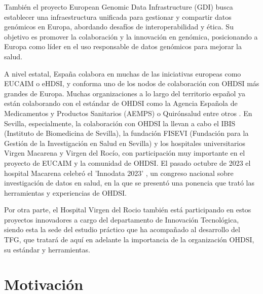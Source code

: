 También el proyecto European Genomic Data Infrastructure (GDI) \cite{GDI2022GDI} busca establecer una infraestructura unificada para gestionar y compartir datos genómicos en Europa, abordando desafíos de interoperabilidad y ética. Su objetivo es promover la colaboración y la innovación en genómica, posicionando a Europa como líder en el uso responsable de datos genómicos para mejorar la salud.

A nivel estatal, España colabora en muchas de las iniciativas europeas como EUCAIM o eHDSI, y conforma uno de los nodos de colaboración con OHDSI más grandes de Europa. Muchas organizaciones a lo largo del territorio español ya están colaborando con el estándar de OHDSI como la Agencia Española de Medicamentos y Productos Sanitarios (AEMPS) o Quirónsalud entre otros \cite{ohdsiSpain}. En Sevilla, especialmente, la colaboración con OHDSI la llevan a cabo el IBIS (Instituto de Biomedicina de Sevilla), la fundación FISEVI (Fundación para la Gestión de la Investigación en Salud en Sevilla) y los hospitales universitarios Virgen Macarena y Virgen del Rocío, con participación muy importante en el proyecto de EUCAIM y la comunidad de OHDSI. El pasado octubre de 2023 el hospital Macarena celebró el 'Innodata 2023' \cite{HUVM2023INNODATA}, un congreso nacional sobre investigación de datos en salud, en la que se presentó una ponencia que trató las herramientas y experiencias de OHDSI. 

Por otra parte, el Hospital Virgen del Rocio también está participando en estos proyectos innovadores a cargo del departamento de Innovación Tecnológica, siendo esta la sede del estudio práctico que ha acompañado al desarrollo del TFG, que tratará de aquí en adelante la importancia de la organización OHDSI, su estándar y herramientas.


\section{Motivación} \label{sec:01Motivacion}


